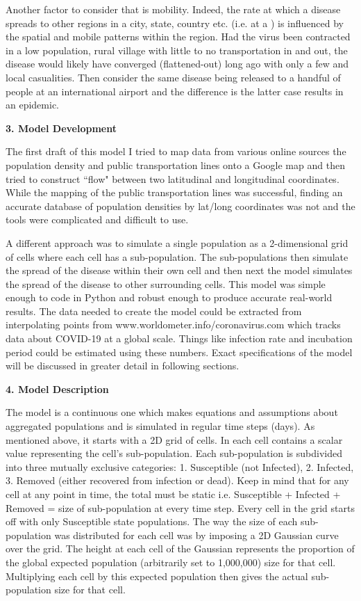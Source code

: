 \documentclass[a4paper]{article}
\begin{document}
Another factor to consider that 
is mobility. Indeed, the rate at which a disease spreads to other regions
in a city, state, country etc. (i.e. at a ) is influenced by the spatial 
and mobile patterns within the region. Had the virus been contracted in a low
population, rural village with little to no transportation in and out, the
disease would likely have converged (flattened-out) long ago with only a few 
and local casualities. Then consider the same disease being released to a handful
of people at an international airport and the difference is the latter case
results in an epidemic. 

\begin{center}
  \textbf{3. Model Development}
\end{center}

The first draft of this model I tried to map data from various online sources the
population density and public transportation lines onto a Google map and then tried
to construct ``flow" between two latitudinal and longitudinal coordinates. While
the mapping of the public transportation lines was successful, finding an
accurate database of population densities by lat/long coordinates was not and
the tools were complicated and difficult to use. 

A different approach was to simulate a single population as a 2-dimensional grid
of cells where each cell has a sub-population. The sub-populations then simulate
the spread of the disease within their own cell and then next the model simulates
the spread of the disease to other surrounding cells. This model was simple
enough to code in Python and robust enough to produce accurate real-world
results. The data needed to create the model could be extracted from
interpolating points from www.worldometer.info/coronavirus.com which tracks data
about COVID-19 at a global scale. Things like infection rate and incubation
period could be estimated using these numbers. Exact specifications of the model will
be discussed in greater detail in following sections.

\begin{center}
  \textbf{4. Model Description}
\end{center}

The model is a continuous one which makes equations and assumptions about aggregated 
populations and is simulated in regular time steps (days). As mentioned above, it starts with 
a 2D grid of cells. In each cell contains a scalar value representing the cell's
sub-population. Each sub-population is subdivided into three mutually exclusive
categories: 1. Susceptible (not Infected), 2. Infected, 3. Removed (either
recovered from infection or dead). Keep in mind that for any cell at any
point in time, the total must be static i.e. Susceptible + Infected + Removed = size of
sub-population at every time step. Every cell in the grid starts off with only Susceptible
state populations. The way the size of each sub-population was distributed for each cell was
by imposing a 2D Gaussian curve over the grid. The height at each cell
of the Gaussian represents the proportion of the global expected population (arbitrarily
set to 1,000,000) size for that cell. Multiplying each cell by this expected population then 
gives the actual sub-population size for that cell.
\end{document}

